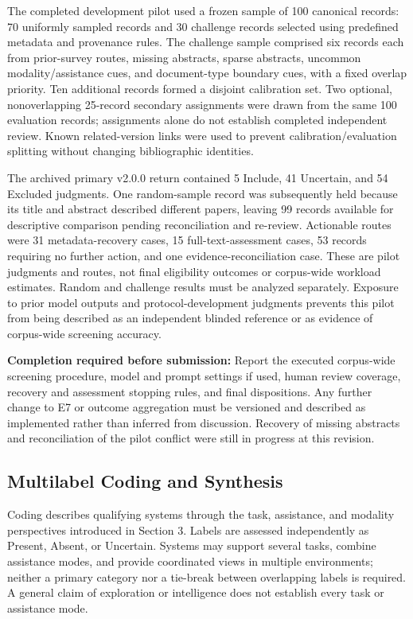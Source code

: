 The completed development pilot used a frozen sample of 100 canonical records: 70 uniformly sampled records and 30 challenge records selected using predefined metadata and provenance rules. The challenge sample comprised six records each from prior-survey routes, missing abstracts, sparse abstracts, uncommon modality/assistance cues, and document-type boundary cues, with a fixed overlap priority. Ten additional records formed a disjoint calibration set. Two optional, nonoverlapping 25-record secondary assignments were drawn from the same 100 evaluation records; assignments alone do not establish completed independent review. Known related-version links were used to prevent calibration/evaluation splitting without changing bibliographic identities.

The archived primary v2.0.0 return contained 5 Include, 41 Uncertain, and 54 Excluded judgments. One random-sample record was subsequently held because its title and abstract described different papers, leaving 99 records available for descriptive comparison pending reconciliation and re-review. Actionable routes were 31 metadata-recovery cases, 15 full-text-assessment cases, 53 records requiring no further action, and one evidence-reconciliation case. These are pilot judgments and routes, not final eligibility outcomes or corpus-wide workload estimates. Random and challenge results must be analyzed separately. Exposure to prior model outputs and protocol-development judgments prevents this pilot from being described as an independent blinded reference or as evidence of corpus-wide screening accuracy.

\noindent\textbf{Completion required before submission:} Report the executed corpus-wide screening procedure, model and prompt settings if used, human review coverage, recovery and assessment stopping rules, and final dispositions. Any further change to E7 or outcome aggregation must be versioned and described as implemented rather than inferred from discussion. Recovery of missing abstracts and reconciliation of the pilot conflict were still in progress at this revision.

\subsection{Multilabel Coding and Synthesis}
\label{sec:methodology-synthesis}

Coding describes qualifying systems through the task, assistance, and modality perspectives introduced in Section 3. Labels are assessed independently as Present, Absent, or Uncertain. Systems may support several tasks, combine assistance modes, and provide coordinated views in multiple environments; neither a primary category nor a tie-break between overlapping labels is required. A general claim of exploration or intelligence does not establish every task or assistance mode.

